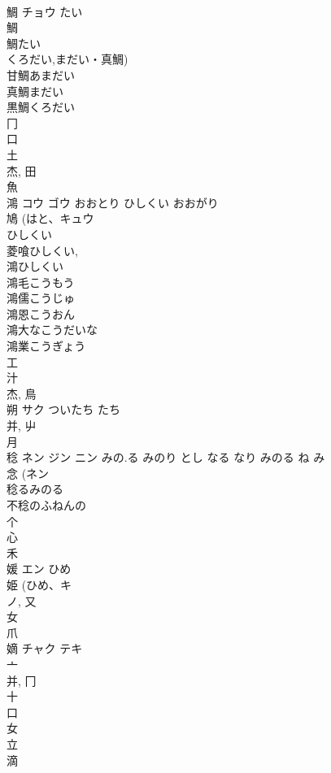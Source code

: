 \documentclass[8pt]{extreport}
\begin{document}
\begin{CJK}{UTF8}{min}
\\	鯛	チョウ	たい	
\\	鯛 
\\	鯛たい 
\\	くろだい,まだい・真鯛)
\\	甘鯛あまだい 
\\	真鯛まだい 
\\	黒鯛くろだい 
\\	冂 
\\	口 
\\	土 
\\	杰, 田 
\\	魚 
\\	鴻	コウ ゴウ	おおとり ひしくい おおがり	
\\	鳩 (はと、キュウ 
\\	ひしくい 
\\	菱喰ひしくい, 
\\	鴻ひしくい 
\\	鴻毛こうもう 
\\	鴻儒こうじゅ 
\\	鴻恩こうおん 
\\	鴻大なこうだいな 
\\	鴻業こうぎょう 
\\	工 
\\	汁 
\\	杰, 鳥 
\\	朔	サク	ついたち たち	
\\	并, 屮 
\\	月 
\\	稔	ネン ジン ニン	みの.る みのり とし なる なり みのる ね み	
\\	念 (ネン 
\\	稔るみのる 
\\	不稔のふねんの 
\\	个 
\\	心 
\\	禾 
\\	媛	エン	ひめ	
\\	姫 (ひめ、キ 
\\	ノ, 又 
\\	女 
\\	爪 
\\	嫡	チャク テキ		
\\	亠 
\\	并, 冂 
\\	十 
\\	口 
\\	女 
\\	立 
\\	滴 

\end{CJK}
\end{document}
